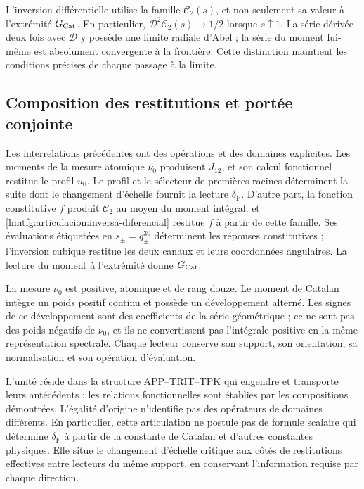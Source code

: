 L’inversion différentielle utilise la famille \(\mathcal C_2(s)\),
et non seulement sa valeur à l’extrémité \(G_{\rm Cat}\). En particulier,
\(\mathcal D^2\mathcal C_2(s)\to1/2\) lorsque \(s\uparrow1\).
La série dérivée deux fois avec \(\mathcal D\) y possède
une limite radiale d’Abel ; la série du moment lui-même est
absolument convergente à la frontière. Cette distinction maintient
les conditions précises de chaque passage à la limite.

\subsection{Composition des restitutions et portée conjointe}
\label{hmtfg:articulacion:conclusion}

Les interrelations précédentes ont des opérations et des domaines
explicites. Les moments de la mesure atomique \(\nu_0\)
produisent \(J_{12}\), et son calcul fonctionnel restitue le profil
\(u_0\). Le profil et le sélecteur de premières racines déterminent
la suite dont le changement d’échelle fournit la lecture \(\delta_{\mathrm F}\).
D’autre part, la fonction constitutive \(f\) produit
\(\mathcal C_2\) au moyen du moment intégral, et
\eqref{hmtfg:articulacion:inversa-diferencial} restitue \(f\)
à partir de cette famille. Ses évaluations étiquetées en
\(s_\pm=q_\pm^{30}\) déterminent les réponses constitutives ;
l’inversion cubique restitue les deux canaux et leurs coordonnées
angulaires. La lecture du moment à l’extrémité donne \(G_{\rm Cat}\).

La mesure \(\nu_0\) est positive, atomique et de rang douze.
Le moment de Catalan intègre un poids positif continu et possède
un développement alterné. Les signes de ce développement sont des
coefficients de la série géométrique ; ce ne sont pas des poids négatifs de
\(\nu_0\), et ils ne convertissent pas l’intégrale positive en la même
représentation spectrale. Chaque lecteur conserve son support,
son orientation, sa normalisation et son opération d’évaluation.

L’unité réside dans la structure APP--TRIT--TPK qui engendre et
transporte leurs antécédents ; les relations fonctionnelles sont
établies par les compositions démontrées. L’égalité
d’origine n’identifie pas des opérateurs de domaines différents.
En particulier, cette articulation ne postule pas de formule scalaire
qui détermine \(\delta_{\mathrm F}\) à partir de la constante de Catalan et
d’autres constantes physiques. Elle situe le changement d’échelle critique aux côtés de
restitutions effectives entre lecteurs du même support,
en conservant l’information requise par chaque direction.
